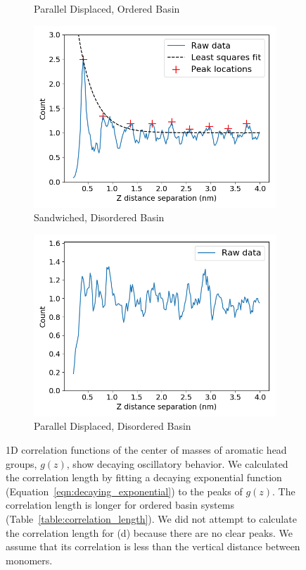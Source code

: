 \documentclass[journal=jpcbfk,manusciprt=article]{achemso}
\begin{document}
\begin{figure}
\begin{subfigure}{0.45\textwidth}
  \caption{Parallel Displaced, Ordered Basin}\label{fig:z_correlation_offset}
  \end{subfigure}  
  \begin{subfigure}{0.45\textwidth}
  \centering
  \includegraphics[width=\textwidth]{z_correlation_sandwich_disordered.png}
  \caption{Sandwiched, Disordered Basin}\label{fig:z_correlation_sandwich_disordered}
  \end{subfigure}  
  \begin{subfigure}{0.45\textwidth}
  \centering
  \includegraphics[width=\textwidth]{z_correlation_offset_disordered.png}
  \caption{Parallel Displaced, Disordered Basin}\label{fig:z_correlation_offset_disordered}
  \end{subfigure}  
  \caption{1D correlation functions of the center of masses of aromatic head groups, $g(z)$, show
  decaying oscillatory behavior. We calculated the correlation length by fitting a decaying exponential
  function (Equation~\ref{eqn:decaying_exponential}) to the peaks of $g(z)$. The correlation length is
  longer for ordered basin systems (Table~\ref{table:correlation_length}).
  We did not attempt to calculate the correlation length for (d) because there are no clear peaks. We 
  assume that its correlation is less than the vertical distance between monomers.}\label{fig:correlation}
  \end{figure}
  
\end{document}
